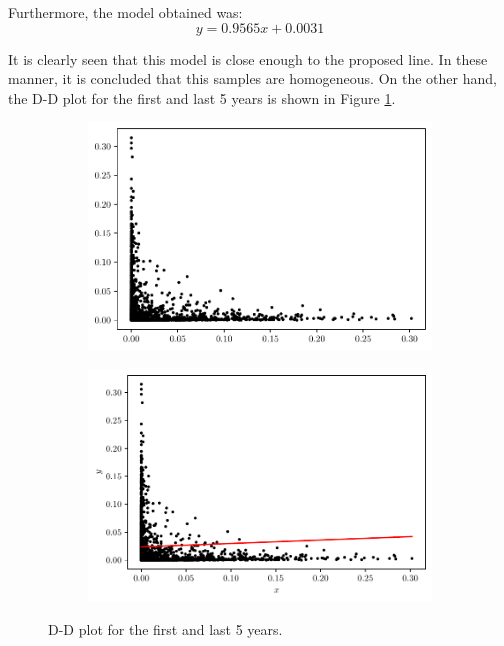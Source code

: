\documentclass[fleqn]{article}
\begin{document}
\begin{enumerate}[label=\alph*)]
    Furthermore, the model obtained was:
    \[
    y = 0.9565 x + 0.0031
    \]

    It is clearly seen that this model is close enough to the proposed line. In
    these manner, it is concluded that this samples are homogeneous. On the
    other hand, the D-D plot for the first and last 5 years is shown in Figure
    \ref{fig:ddplot5}.
    \begin{figure}[H]
      \centering
      \begin{subfigure}[b]{0.45\textwidth}
        \centering
        \includegraphics[scale=.5]{../figs/ddplot-5}
      \end{subfigure}
      \begin{subfigure}[b]{0.45\textwidth}
        \centering
        \includegraphics[scale=.5]{../figs/scatter-vs-model-ddplot-5}
      \end{subfigure}
      \caption{D-D plot for the first and last 5 years.}
      \label{fig:ddplot5}
    \end{figure}


\end{enumerate}
\end{document}
